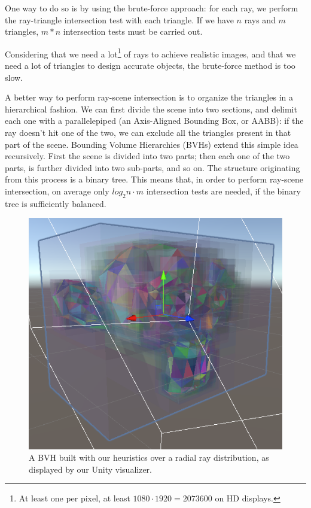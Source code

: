 \documentclass{PoliMi_MasterThesis}
\begin{document}
One way to do so is by using the brute-force approach: for each ray, we perform the ray-triangle intersection test with each triangle. If we have $n$ rays and $m$ triangles, $m*n$ intersection tests must be carried out.

Considering that we need a lot\footnote{At least one per pixel, at least $1080 \cdot 1920 = 2073600$ on HD displays.} of rays to achieve realistic images, and that we need a lot of triangles to design accurate objects, the brute-force method is too slow.

A better way to perform ray-scene intersection is to organize the triangles in a hierarchical fashion. We can first divide the scene into two sections, and delimit each one with a parallelepiped (an Axis-Aligned Bounding Box, or AABB): if the ray doesn't hit one of the two, we can exclude all the triangles present in that part of the scene. Bounding Volume Hierarchies (BVHs) extend this simple idea recursively. First the scene is divided into two parts; then each one of the two parts, is further divided into two sub-parts, and so on. The structure originating from this process is a binary tree. This means that, in order to perform ray-scene intersection, on average only $log_2 n \cdot m$ intersection tests are needed, if the binary tree is sufficiently balanced.

\begin{figure}[]
    \centering
    \includegraphics[width=\textwidth*\real{0.55}]{Images/suzanne_visualizer.png}
    \caption{A BVH built with our heuristics over a radial ray distribution, as displayed by our Unity visualizer.}
    \label{fig:suzanne_intro}
\end{figure}
\end{document}
